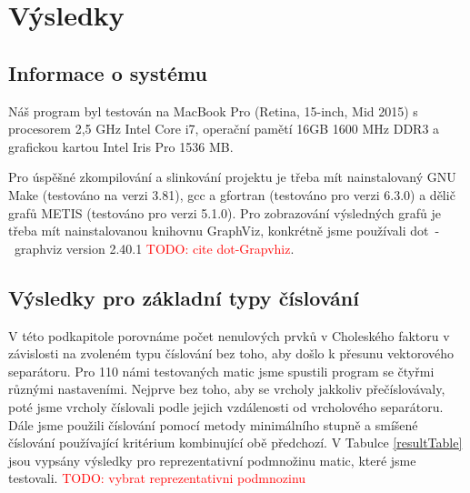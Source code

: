 \documentclass[11pt,american,czech,oneside]{book}
\theoremstyle{plain}
\theoremstyle{definition}
\newcommand{\TODO}[1]{\textcolor{red}{TODO: #1}}
\begin{document}
\chapter{Výsledky}

\section{Informace o systému}
Náš program byl testován na MacBook Pro (Retina, 15-inch, Mid 2015) s procesorem 2,5 GHz Intel Core i7, operační pamětí 16GB 1600 MHz DDR3 a grafickou kartou Intel Iris Pro 1536 MB.

Pro úspěšné zkompilování a slinkování projektu je třeba mít nainstalovaný GNU Make (testováno na verzi 3.81), gcc a gfortran (testováno pro verzi 6.3.0) a dělič grafů METIS (testováno pro verzi 5.1.0). Pro zobrazování výsledných grafů je třeba mít nainstalovanou knihovnu GraphViz, konkrétně jsme používali dot~-~graphviz version 2.40.1 \TODO{cite dot-Grapvhiz}.

\section{Výsledky pro základní typy číslování}
\label{numberingResultsSection}
V této podkapitole porovnáme počet nenulových prvků v Choleského faktoru v závislosti na zvoleném typu číslování bez toho, aby došlo k přesunu vektorového separátoru. Pro 110 námi testovaných matic jsme spustili program se čtyřmi různými nastaveními. Nejprve bez toho, aby se vrcholy jakkoliv přečíslovávaly, poté jsme vrcholy číslovali podle jejich vzdálenosti od vrcholového separátoru. Dále jsme použili číslování pomocí metody minimálního stupně a smíšené číslování používající kritérium kombinující obě předchozí. V Tabulce \ref{resultTable} jsou vypsány výsledky pro reprezentativní podmnožinu matic, které jsme testovali. 
\TODO{vybrat reprezentativni podmnozinu}
\end{document}
